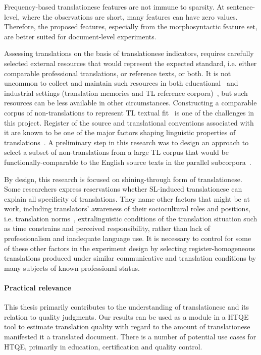 Frequency-based translationese features are not immune to sparsity. At sentence-level, where the observations are short, many features can have zero values. Therefore, the proposed features, especially from the morphosyntactic feature set, are better suited for document-level experiments.

Assessing translations on the basis of translationese indicators, requires carefully selected external resources that would represent the expected standard, i.e. either comparable professional translations, or reference texts, or both. It is not uncommon to collect and maintain such resources in both educational~\citep{Bowker2001} and industrial settings (translation memories and \gls*{TL} reference corpora)~\citep{Massey2019}, but such resources can be less available in other circumstances. 
Constructing a comparable corpus of non-translations to represent \gls*{TL} textual fit~\citep{Chesterman2004} is one of the challenges in this project. Register of the source and translational conventions associated with it are known to be one of the major factors shaping linguistic properties of translations~\cite{Lapshinova2017}. A preliminary step in this research was to design an approach to select a subset of non-translations from a large TL corpus that would be functionally-comparable to the English source texts in the parallel subcorpora~\cite{Kunilovskaya2019crossling}.

By design, this research is focused on shining-through form of translationese. Some researchers express reservations whether SL-induced translationese can explain all specificity of translations. They name other factors that might be at work, including translators' awareness of their sociocultural roles and positions, i.e. translation norms~\cite{Laviosa2008, Delaere2012}, extralinguistic conditions of the translation situation such as time constrains and perceived responsibility, rather than lack of professionalism and inadequate language use. It is necessary to control for some of these other factors in the experiment design by selecting register-homogeneous translations produced under similar communicative and translation conditions by many subjects of known professional status.

\paragraph{Practical relevance} This thesis primarily contributes to the understanding of translationese and its relation to quality judgments. Our results can be used as a module in a \gls{HTQE} tool to estimate translation quality with regard to the amount of translationese manifested it a translated document. There is a number of potential use cases for \gls*{HTQE}, primarily in education, certification and quality control.

